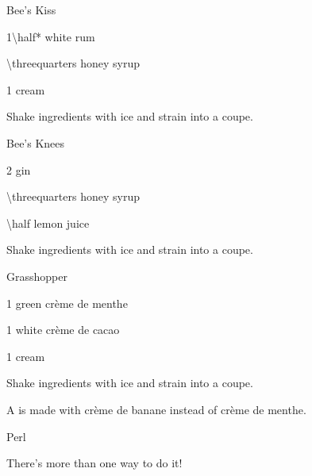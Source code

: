 \begin{Cocktail}{Bee's Kiss}
	\begin{Ingredients}
	\item \SI{1\half*}{\oz} white rum
	\item \SI{\threequarters}{\oz} honey syrup %
	\item \SI{1}{\oz} cream
	\end{Ingredients}
	
	\begin{Instructions}
	Shake ingredients with ice and strain into a coupe.
	\end{Instructions}
\end{Cocktail}

\begin{Cocktail}{Bee's Knees}
	\begin{Ingredients}
	\item \SI{2}{\oz} gin
	\item \SI{\threequarters}{\oz} honey syrup
	\item \SI{\half}{\oz} lemon juice
	\end{Ingredients}
	
	\begin{Instructions}
	Shake ingredients with ice and strain into a coupe.
	\end{Instructions}
\end{Cocktail}

\begin{Cocktail}{Grasshopper}
	\begin{Ingredients}
	\item \SI{1}{\oz} green cr\`eme de menthe
	\item \SI{1}{\oz} white cr\`eme de cacao
	\item \SI{1}{\oz} cream
	\end{Ingredients}
	
	\begin{Instructions}
	Shake ingredients with ice and strain into a coupe.
	
	A  is made with cr\`eme de banane instead of cr\`eme de menthe.
	\end{Instructions}
\end{Cocktail}

\begin{Cocktail*}{Perl}
	\begin{Ingredients}
	\item
	\end{Ingredients}
	
	\begin{Instructions}
	There's more than one way to do it!
	\end{Instructions}
\end{Cocktail*}

